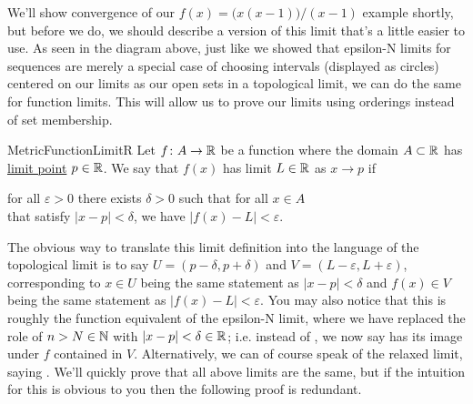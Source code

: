 \documentclass[11pt]{article}
\begin{document}

We'll show convergence of our $f(x) = \big(x(x-1)\big)/(x-1)$ example shortly, but before we do, we should describe a version of this limit that's a little easier to use. As seen in the diagram above, just like we showed that epsilon-N limits for sequences are merely a special case of choosing intervals (displayed as circles) centered on our limits as our open sets in a topological limit, we can do the same for function limits. This will allow us to prove our limits using orderings instead of set membership.

\begin{label definition}{MetricFunctionLimitR}
Let $f\colon A \to \mathbb{R}$ be a function where the domain $A \subset \mathbb{R}$ has \hyperref[pro:ClosedSetsClosedUnderLimitsR]{limit point} $p\in \mathbb{R}$. We say that $f(x)$ has limit $L\in \mathbb{R}$ as $x \to p$ if

\begin{center}
for all $\varepsilon > 0$ there exists $\delta > 0$ such that for all $x \in A$ \\
that satisfy $|x - p|< \delta$, we have $|f(x) - L| < \varepsilon$.
\end{center}
\end{label definition}

The obvious way to translate this limit definition into the language of the topological limit is to say $U = (p - \delta, p + \delta)$ and $V = (L - \varepsilon, L + \varepsilon)$, corresponding to $x \in U$ being the same statement as $|x - p| < \delta$ and $f(x) \in V$ being the same statement as $|f(x) - L| < \varepsilon$. You may also notice that this is roughly the function equivalent of the epsilon-N limit, where we have replaced the role of $n > N \in \mathbb{N}$ with $|x - p|< \delta \in \mathbb{R}$; i.e. instead of , we now say  has its image under $f$ contained in $V$. Alternatively, we can of course speak of the relaxed limit, saying . We'll quickly prove that all above limits are the same, but if the intuition for this is obvious to you then the following proof is redundant.
\end{document}
